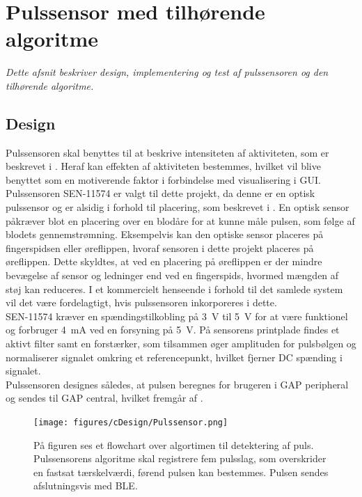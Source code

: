 \section{Pulssensor med tilhørende algoritme}\label{sec_de_im_te_puls}
\textit{Dette afsnit beskriver design, implementering og test af pulssensoren og den tilhørende algoritme.}

\subsection{Design} \label{sec_design_puls}
Pulssensoren skal benyttes til at beskrive intensiteten af aktiviteten, som er beskrevet i . Heraf kan effekten af aktiviteten bestemmes, hvilket vil blive benyttet som en motiverende faktor i forbindelse med visualisering i GUI. \newline
Pulssensoren SEN-11574 er valgt til dette projekt, da denne er en optisk pulssensor og er alsidig i forhold til placering, som beskrevet i . En optisk sensor påkræver blot en placering over en blodåre for at kunne måle pulsen, som følge af blodets gennemstrømning. Eksempelvis kan den optiske sensor placeres på fingerspidsen eller øreflippen, hvoraf sensoren i dette projekt placeres på øreflippen. Dette skyldtes, at ved en placering på øreflippen er der mindre bevægelse af sensor og ledninger end ved en fingerspids, hvormed mængden af støj kan reduceres. I et kommercielt henseende i forhold til det samlede system vil det være fordelagtigt, hvis pulssensoren inkorporeres i dette. \\
SEN-11574 kræver en spændingstilkobling på 3~V til 5~V for at være funktionel og forbruger 4~mA ved en forsyning på 5~V. På sensorens printplade findes et aktivt filter samt en forstærker, som tilsammen øger amplituden for pulsbølgen og normaliserer signalet omkring et referencepunkt, hvilket fjerner DC spænding i signalet.~\citep{Murphy2016,Murphy2016_sensor}\\
Pulssensoren designes således, at pulsen beregnes for brugeren i GAP peripheral og sendes til GAP central, hvilket fremgår af .
\begin{figure}[H]
	\centering
	\texttt{[image: figures/cDesign/Pulssensor.png]}
	\caption{På figuren ses et flowchart over algortimen til detektering af puls. Pulssensorens algoritme skal registrere fem pulsslag, som overskrider en fastsat tærskelværdi, førend pulsen kan bestemmes. Pulsen sendes afslutningsvis med BLE.}
	\label{fig:puls_pseudo}
\end{figure}\vspace{-.25cm}
